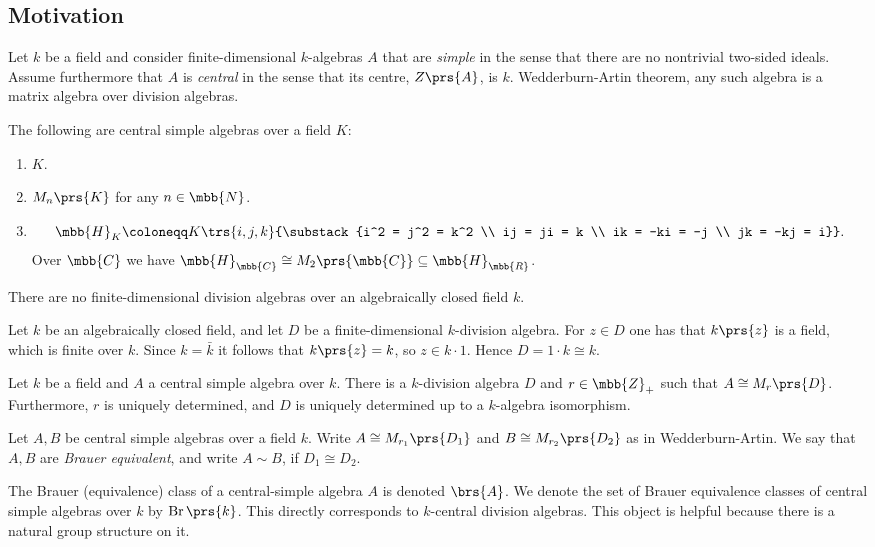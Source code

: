 \documentclass[11pt]{kbook}
\DeclareMathOperator{\Br}{Br}
\begin{document}
\subsection*{Motivation}

Let $k$ be a field and consider finite-dimensional $k$-algebras $A$ that are \emph{simple} in the sense that there are no nontrivial two-sided ideals. Assume furthermore that $A$ is \emph{central} in the sense that its centre, $Z\prs{A}$, is $k$.
Wedderburn-Artin theorem, any such algebra is a matrix algebra over division algebras.

\begin{example}
The following are central simple algebras over a field $K$:

\begin{enumerate}
\item $K$.
\item $M_n\prs{K}$ for any $n \in \mbb{N}$.
\item \[\mbb{H}_K \coloneqq K\trs{i,j,k}{\substack{i^2 = j^2 = k^2 \\ ij = ji = k \\ ik = -ki = -j \\ jk = -kj = i}} \text{.}\]
Over $\mbb{C}$ we have $\mbb{H}_{\mbb{C}} \cong M_2\prs{\mbb{C}} \subseteq \mbb{H}_{\mbb{R}}$.
\end{enumerate}
\end{example}

\begin{example}
There are no finite-dimensional division algebras over an algebraically closed field $k$.

Let $k$ be an algebraically closed field, and let $D$ be a finite-dimensional $k$-division algebra. For $z \in D$ one has that $k\prs{z}$ is a field, which is finite over $k$. Since $k = \bar{k}$ it follows that $k\prs{z} = k$, so $z \in k \cdot 1$. Hence $D = 1 \cdot k \cong k$.
\end{example}

\begin{theorem}
Let $k$ be a field and $A$ a central simple algebra over $k$. There is a $k$-division algebra $D$ and $r \in \mbb{Z}_+$ such that $A \cong M_r\prs{D}$. Furthermore, $r$ is uniquely determined, and $D$ is uniquely determined up to a $k$-algebra isomorphism.
\end{theorem}

\begin{definition}
Let $A,B$ be central simple algebras over a field $k$. Write $A \cong M_{r_1}\prs{D_1}$ and $B \cong M_{r_2}\prs{D_2}$ as in Wedderburn-Artin. We say that $A,B$ are \emph{Brauer equivalent}, and write $A \sim B$, if $D_1 \cong D_2$.

The Brauer (equivalence) class of a central-simple algebra $A$ is denoted $\brs{A}$. We denote the set of Brauer equivalence classes of central simple algebras over $k$ by $\Br\prs{k}$. This directly corresponds to $k$-central division algebras. This object is helpful because there is a natural group structure on it.
\end{definition}
\end{document}
